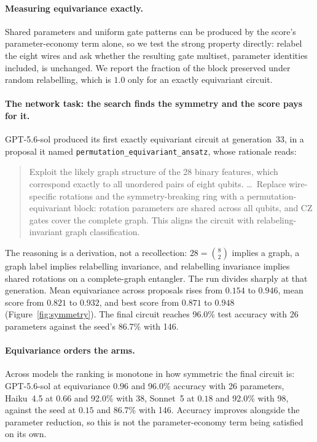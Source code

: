 \documentclass[11pt]{article}
\begin{document}
\paragraph{Measuring equivariance exactly.}
Shared parameters and uniform gate patterns can be produced by the score's
parameter-economy term alone, so we test the strong property directly: relabel
the eight wires and ask whether the resulting gate multiset, parameter identities
included, is unchanged. We report the fraction of the block preserved under
random relabelling, which is $1.0$ only for an exactly equivariant circuit.

\paragraph{The network task: the search finds the symmetry and the score pays for it.}
GPT-5.6-sol produced its first exactly equivariant circuit at generation~33, in a
proposal it named \texttt{permutation\_equivariant\_ansatz}, whose rationale reads:

\begin{quote}\small
Exploit the likely graph structure of the 28 binary features, which correspond
exactly to all unordered pairs of eight qubits. \ldots\ Replace wire-specific
rotations and the symmetry-breaking ring with a permutation-equivariant block:
rotation parameters are shared across all qubits, and CZ gates cover the complete
graph. This aligns the circuit with relabeling-invariant graph classification.
\end{quote}

The reasoning is a derivation, not a recollection: $28 = \binom{8}{2}$ implies a
graph, a graph label implies relabelling invariance, and relabelling invariance
implies shared rotations on a complete-graph entangler. The run divides sharply
at that generation. Mean equivariance across proposals rises from $0.154$ to
$0.946$, mean score from $0.821$ to $0.932$, and best score from $0.871$ to
$0.948$ (Figure~\ref{fig:symmetry}). The final circuit reaches 96.0\% test
accuracy with 26 parameters against the seed's 86.7\% with 146.

\paragraph{Equivariance orders the arms.}
Across models the ranking is monotone in how symmetric the final circuit is:
GPT-5.6-sol at equivariance $0.96$ and 96.0\% accuracy with 26 parameters,
Haiku~4.5 at $0.66$ and 92.0\% with 38, Sonnet~5 at $0.18$ and 92.0\% with 98,
against the seed at $0.15$ and 86.7\% with 146. Accuracy improves alongside the
parameter reduction, so this is not the parameter-economy term being satisfied on
its own.
\end{document}
